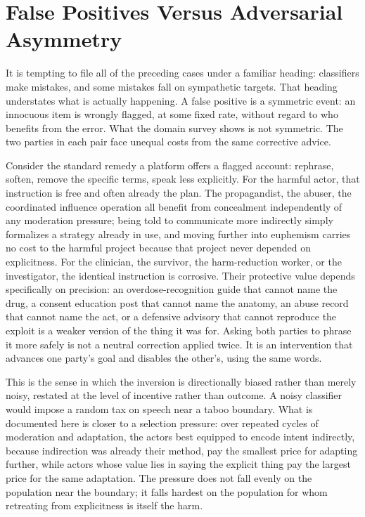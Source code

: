 \documentclass[11pt]{article}
\begin{document}
\section{False Positives Versus Adversarial Asymmetry}

It is tempting to file all of the preceding cases under a familiar heading: classifiers make mistakes, and some mistakes fall on sympathetic targets. That heading understates what is actually happening. A false positive is a symmetric event: an innocuous item is wrongly flagged, at some fixed rate, without regard to who benefits from the error. What the domain survey shows is not symmetric. The two parties in each pair face unequal costs from the same corrective advice.

Consider the standard remedy a platform offers a flagged account: rephrase, soften, remove the specific terms, speak less explicitly. For the harmful actor, that instruction is free and often already the plan. The propagandist, the abuser, the coordinated influence operation all benefit from concealment independently of any moderation pressure; being told to communicate more indirectly simply formalizes a strategy already in use, and moving further into euphemism carries no cost to the harmful project because that project never depended on explicitness. For the clinician, the survivor, the harm-reduction worker, or the investigator, the identical instruction is corrosive. Their protective value depends specifically on precision: an overdose-recognition guide that cannot name the drug, a consent education post that cannot name the anatomy, an abuse record that cannot name the act, or a defensive advisory that cannot reproduce the exploit is a weaker version of the thing it was for. Asking both parties to phrase it more safely is not a neutral correction applied twice. It is an intervention that advances one party's goal and disables the other's, using the same words.

This is the sense in which the inversion is directionally biased rather than merely noisy, restated at the level of incentive rather than outcome. A noisy classifier would impose a random tax on speech near a taboo boundary. What is documented here is closer to a selection pressure: over repeated cycles of moderation and adaptation, the actors best equipped to encode intent indirectly, because indirection was already their method, pay the smallest price for adapting further, while actors whose value lies in saying the explicit thing pay the largest price for the same adaptation. The pressure does not fall evenly on the population near the boundary; it falls hardest on the population for whom retreating from explicitness is itself the harm.
\end{document}
